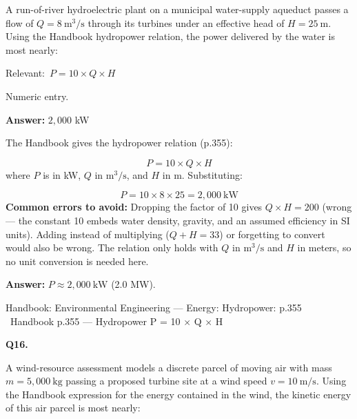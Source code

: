 \documentclass[11pt]{article}
\begin{document}
A run-of-river hydroelectric plant on a municipal water-supply aqueduct passes a flow of $Q = 8\ \text{m}^3/\text{s}$ through its turbines under an effective head of $H = 25\ \text{m}$. Using the Handbook hydropower relation, the power delivered by the water is most nearly:\par\par\vspace{3pt}
{\small\color{soft}Relevant:}\ $P = 10 \times Q \times H$\par\vspace{3pt}
{\small\color{soft}Numeric entry.}\par\vspace{3pt}
\vspace{2pt}\par\noindent\colorbox{boxbg}{\parbox{\dimexpr\linewidth-2\fboxsep\relax}{%
\vspace{2pt}\textbf{Answer:} $2{,}000$ kW\par\vspace{2pt}
{\small The Handbook gives the hydropower relation (p.355):\par
\[P = 10 \times Q \times H\]
where $P$ is in kW, $Q$ in $\text{m}^3/\text{s}$, and $H$ in m. Substituting:\par
\[P = 10 \times 8 \times 25 = 2{,}000\ \text{kW}\]
\textbf{Common errors to avoid:} Dropping the factor of 10 gives $Q \times H = 200$ (wrong --- the constant 10 embeds water density, gravity, and an assumed efficiency in SI units). Adding instead of multiplying ($Q + H = 33$) or forgetting to convert would also be wrong. The relation only holds with $Q$ in $\text{m}^3/\text{s}$ and $H$ in meters, so no unit conversion is needed here.\par
\textbf{Answer:} $P \approx 2{,}000\ \text{kW}$ (2.0 MW).\par}\par\vspace{2pt}
{\footnotesize\color{soft}Handbook: Environmental Engineering --- Energy: Hydropower: p.355 \textbullet\ Handbook p.355 --- Hydropower P = 10 $\times$ Q $\times$ H}\vspace{2pt}
}}
\vspace{9pt}
\filbreak
\textbf{\color{accent}Q16.}\par\vspace{2pt}
A wind-resource assessment models a discrete parcel of moving air with mass $m = 5{,}000\ \text{kg}$ passing a proposed turbine site at a wind speed $v = 10\ \text{m/s}$. Using the Handbook expression for the energy contained in the wind, the kinetic energy of this air parcel is most nearly:\par\par\vspace{3pt}
\end{document}
